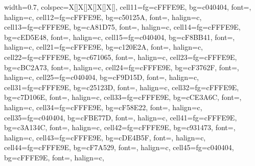 \begin{table}
\centering
\begin{tblr}[         %
]                     %
{                     %
width={0.7\linewidth},
colspec={X[]X[]X[]X[]X[]},
cell{1}{1}={}{fg=cFFFE9E, bg=c040404, font=\fontsize{0.1em}{0.4em}\selectfont, halign=c},
cell{1}{2}={}{fg=cFFFE9E, bg=c50125A, font=\fontsize{0.5em}{0.8em}\selectfont, halign=c},
cell{1}{3}={}{fg=cFFFE9E, bg=cA81D75, font=\fontsize{0.9em}{1.2em}\selectfont, halign=c},
cell{1}{4}={}{fg=cFFFE9E, bg=cED5E48, font=\fontsize{1.3em}{1.6em}\selectfont, halign=c},
cell{1}{5}={}{fg=c040404, bg=cF8BB41, font=\fontsize{1.7em}{2em}\selectfont, halign=c},
cell{2}{1}={}{fg=cFFFE9E, bg=c120E2A, font=\fontsize{0.2em}{0.5em}\selectfont, halign=c},
cell{2}{2}={}{fg=cFFFE9E, bg=c671065, font=\fontsize{0.6em}{0.9em}\selectfont, halign=c},
cell{2}{3}={}{fg=cFFFE9E, bg=cBC2A73, font=\fontsize{1em}{1.3em}\selectfont, halign=c},
cell{2}{4}={}{fg=cFFFE9E, bg=cF3762F, font=\fontsize{1.4em}{1.7em}\selectfont, halign=c},
cell{2}{5}={}{fg=c040404, bg=cF9D15D, font=\fontsize{1.8em}{2.1em}\selectfont, halign=c},
cell{3}{1}={}{fg=cFFFE9E, bg=c25123D, font=\fontsize{0.3em}{0.6em}\selectfont, halign=c},
cell{3}{2}={}{fg=cFFFE9E, bg=c7D106E, font=\fontsize{0.7em}{1em}\selectfont, halign=c},
cell{3}{3}={}{fg=cFFFE9E, bg=cCE3A6C, font=\fontsize{1.1em}{1.4em}\selectfont, halign=c},
cell{3}{4}={}{fg=cFFFE9E, bg=cF58E22, font=\fontsize{1.5em}{1.8em}\selectfont, halign=c},
cell{3}{5}={}{fg=c040404, bg=cFBE77D, font=\fontsize{1.9em}{2.2em}\selectfont, halign=c},
cell{4}{1}={}{fg=cFFFE9E, bg=c3A134C, font=\fontsize{0.4em}{0.7em}\selectfont, halign=c},
cell{4}{2}={}{fg=cFFFE9E, bg=c931473, font=\fontsize{0.8em}{1.1em}\selectfont, halign=c},
cell{4}{3}={}{fg=cFFFE9E, bg=cDE4B5F, font=\fontsize{1.2em}{1.5em}\selectfont, halign=c},
cell{4}{4}={}{fg=cFFFE9E, bg=cF7A529, font=\fontsize{1.6em}{1.9em}\selectfont, halign=c},
cell{4}{5}={}{fg=c040404, bg=cFFFE9E, font=\fontsize{2em}{2.3em}\selectfont, halign=c},
}                     %

\end{tblr}
\end{table}
